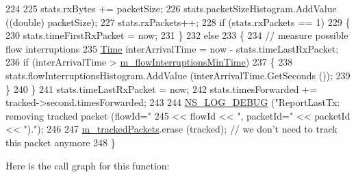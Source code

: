 \begin{DoxyCode}
224 
225   stats.rxBytes += packetSize;
226   stats.packetSizeHistogram.AddValue ((\textcolor{keywordtype}{double}) packetSize);
227   stats.rxPackets++;
228   \textcolor{keywordflow}{if} (stats.rxPackets == 1)
229     \{
230       stats.timeFirstRxPacket = now;
231     \}
232   \textcolor{keywordflow}{else}
233     \{
234       \textcolor{comment}{// measure possible flow interruptions}
235       \hyperlink{namespacens3_1_1TracedValueCallback_a7ffd3e7c142ffe7c8a1d2db9b8de38ec}{Time} interArrivalTime = now - stats.timeLastRxPacket;
236       \textcolor{keywordflow}{if} (interArrivalTime > \hyperlink{classns3_1_1FlowMonitor_a6d2163354ea89ab71ff2b573502c66b5}{m\_flowInterruptionsMinTime})
237         \{
238           stats.flowInterruptionsHistogram.AddValue (interArrivalTime.GetSeconds ());
239         \}
240     \}
241   stats.timeLastRxPacket = now;
242   stats.timesForwarded += tracked->second.timesForwarded;
243 
244   \hyperlink{group__logging_ga413f1886406d49f59a6a0a89b77b4d0a}{NS\_LOG\_DEBUG} (\textcolor{stringliteral}{"ReportLastTx: removing tracked packet (flowId="}
245                 << flowId << \textcolor{stringliteral}{", packetId="} << packetId << \textcolor{stringliteral}{")."});
246 
247   \hyperlink{classns3_1_1FlowMonitor_ab4f63ca5c2a927337870110fa8233bce}{m\_trackedPackets}.erase (tracked); \textcolor{comment}{// we don't need to track this packet anymore}
248 \}
\end{DoxyCode}


Here is the call graph for this function\+:


